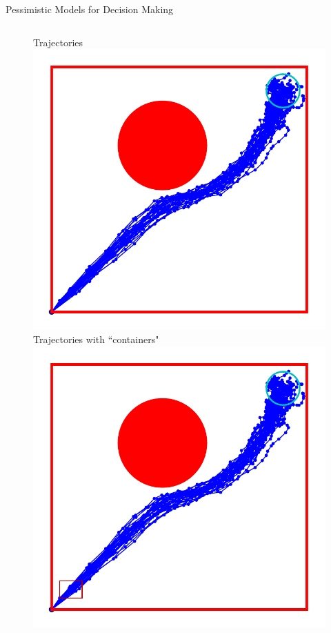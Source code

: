 \documentclass[lecture]{beamer}
\begin{document}
\begin{frame}{\normalsize Pessimistic Models for Decision Making}
\begin{columns}[t]
\begin{overlayarea}{\textwidth}{1\textheight}
\begin{figure}
{	}
        {%
        \center
        Trajectories 
   \includegraphics[width=\FS\textwidth]{Codes/BasicsSafety/PessimisticModel0.pdf}%
        }%
        {%
        \center
        Trajectories with ``containers"
  \includegraphics[width=\FS\textwidth]{Codes/BasicsSafety/PessimisticModel1.pdf}%
}
\end{figure}
\end{overlayarea}
\end{columns}
\end{frame}
\end{document}
